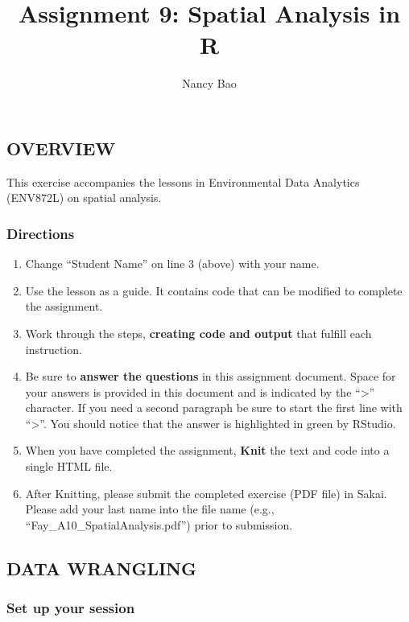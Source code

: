 \documentclass[
]{article}
\title{Assignment 9: Spatial Analysis in R}
\author{Nancy Bao}
\date{}
\providecommand{\tightlist}{%
  \setlength{\itemsep}{0pt}\setlength{\parskip}{0pt}}
\begin{document}
\maketitle

\hypertarget{overview}{%
\subsection{OVERVIEW}\label{overview}}

This exercise accompanies the lessons in Environmental Data Analytics
(ENV872L) on spatial analysis.

\hypertarget{directions}{%
\subsubsection{Directions}\label{directions}}

\begin{enumerate}
\def\labelenumi{\arabic{enumi}.}
\tightlist
\item
  Change ``Student Name'' on line 3 (above) with your name.
\item
  Use the lesson as a guide. It contains code that can be modified to
  complete the assignment.
\item
  Work through the steps, \textbf{creating code and output} that fulfill
  each instruction.
\item
  Be sure to \textbf{answer the questions} in this assignment document.
  Space for your answers is provided in this document and is indicated
  by the ``\textgreater{}'' character. If you need a second paragraph be
  sure to start the first line with ``\textgreater{}''. You should
  notice that the answer is highlighted in green by RStudio.
\item
  When you have completed the assignment, \textbf{Knit} the text and
  code into a single HTML file.
\item
  After Knitting, please submit the completed exercise (PDF file) in
  Sakai. Please add your last name into the file name (e.g.,
  ``Fay\_A10\_SpatialAnalysis.pdf'') prior to submission.
\end{enumerate}

\hypertarget{data-wrangling}{%
\subsection{DATA WRANGLING}\label{data-wrangling}}

\hypertarget{set-up-your-session}{%
\subsubsection{Set up your session}\label{set-up-your-session}}
\end{document}
